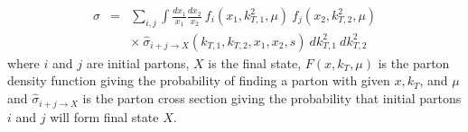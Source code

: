 \begin{eqnarray}
   \sigma &=& \sum_{i,j} \int \frac {dx_1}{x_1} \frac {dx_2}{x_2} \
            f_i (x_1, k_{T,1}^2, \mu) \  f_j (x_2, k_{T,2}^2, \mu) \nonumber \\
    && \times \ {\hat \sigma}_{i+j \rightarrow X} (k_{T,1}, k_{T,2}, x_1, x_2, s) \ dk^2_{T,1} \ dk^2_{T,2}
\end{eqnarray}
where $i$ and $j$ are initial partons, $X$ is the final state,
$F(x, k_T, \mu)$ is the parton density function giving the probability of finding a parton
with given $x, k_T$, and $\mu$ and ${\hat \sigma}_{i+j \rightarrow X}$ is the parton cross
section giving the probability that initial partons $i$ and $j$ will form final state $X$.

